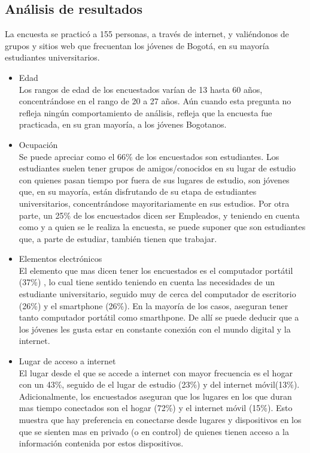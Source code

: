 \subsection{Análisis de resultados}

La encuesta se practicó a 155 personas, a través de internet, y valiéndonos de grupos y sitios web que frecuentan los jóvenes de Bogotá, en su mayoría estudiantes universitarios.\\

\begin{itemize}
  \item Edad \\
  Los rangos de edad de los encuestados varían de 13 hasta 60 años, concentrándose en el rango de 20 a 27 años. Aún cuando esta pregunta no refleja ningún comportamiento de análisis, refleja que la encuesta fue practicada, en su gran mayoría, a los jóvenes Bogotanos.
  \item Ocupación \\
  Se puede apreciar como el 66\% de los encuestados son estudiantes. Los estudiantes suelen tener grupos de amigos/conocidos en su lugar de estudio con quienes pasan tiempo por fuera de sus lugares de estudio, son jóvenes que, en su mayoría, están disfrutando de su etapa de estudiantes universitarios, concentrándose mayoritariamente en sus estudios. Por otra parte, un 25\% de los encuestados dicen ser Empleados, y teniendo en cuenta como y a quien se le realiza la encuesta, se puede suponer que son estudiantes que, a parte de estudiar, también tienen que trabajar.
  \item Elementos electrónicos \\
  El elemento que mas  dicen tener los encuestados es el computador portátil (37\%) , lo cual tiene sentido teniendo en cuenta las necesidades de un estudiante universitario, seguido muy de cerca del computador de escritorio (26\%) y el smartphone (26\%). En la mayoría de los casos, aseguran tener tanto computador portátil como smarthpone. De allí se puede deducir que a los jóvenes les gusta estar en constante conexión con el mundo digital y la internet.
  \item Lugar de acceso a internet \\
  El lugar desde el que se accede a internet con mayor frecuencia es el hogar con un 43\%, seguido de el lugar de estudio (23\%) y del internet móvil(13\%). Adicionalmente, los encuestados aseguran que los lugares en los que duran mas tiempo conectados son el hogar (72\%) y el internet móvil (15\%). Esto muestra que hay preferencia en conectarse desde lugares y dispositivos en los que se sienten mas en privado (o en control) de quienes tienen acceso a la información contenida por estos dispositivos.

\end{itemize}
